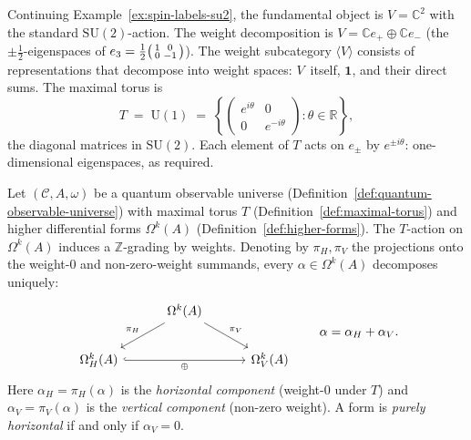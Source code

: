 \begin{example}
\label{ex:maximal-torus-su2}
Continuing Example~\ref{ex:spin-labels-su2}, the fundamental object is
$V = \mathbb{C}^2$ with the standard $\mathrm{SU}(2)$-action.  The
weight decomposition is $V = \mathbb{C} e_+ \oplus \mathbb{C} e_-$
(the $\pm\tfrac{1}{2}$-eigenspaces of
$e_3 = \frac{1}{2}\begin{psmallmatrix} 1 & 0 \\ 0 & -1 \end{psmallmatrix}$).
The weight subcategory $\langle V \rangle$ consists of representations
that decompose into weight spaces: $V$~itself, $\mathbf{1}$, and their
direct sums.  The maximal torus is
\[
  T \;=\; \mathrm{U}(1)
  \;=\; \left\{
    \begin{pmatrix} e^{i\theta} & 0 \\ 0 & e^{-i\theta} \end{pmatrix}
    : \theta \in \mathbb{R}
  \right\},
\]
the diagonal matrices in $\mathrm{SU}(2)$.  Each element of $T$ acts on
$e_{\pm}$ by $e^{\pm i\theta}$: one-dimensional eigenspaces, as required.
\end{example}

\begin{definition}
\label{def:weight-decomposition}
Let $(\mathcal{C}, A, \omega)$ be a quantum observable universe
(Definition~\ref{def:quantum-observable-universe}) with maximal torus
$T$ (Definition~\ref{def:maximal-torus}) and higher differential forms
$\Omega^k(A)$ (Definition~\ref{def:higher-forms}).  The $T$-action on
$\Omega^k(A)$ induces a $\mathbb{Z}$-grading by weights.  Denoting by
$\pi_H, \pi_V$ the projections onto the weight-$0$ and non-zero-weight
summands, every $\alpha \in \Omega^k(A)$ decomposes uniquely:
\begin{equation}\label{eq:weight-decomposition-cd}
\begin{tikzcd}[row sep=2em, column sep=3em]
  & \Omega^k(A) \ar[dl, "\pi_H"'] \ar[dr, "\pi_V"] & \\
  \Omega^k_H(A) \ar[rr, hook, "\oplus"']
  & & \Omega^k_V(A)
\end{tikzcd}
\qquad \alpha = \alpha_H + \alpha_V.
\end{equation}
Here $\alpha_H = \pi_H(\alpha)$ is the \emph{horizontal component}
(weight-$0$ under $T$) and $\alpha_V = \pi_V(\alpha)$ is the
\emph{vertical component} (non-zero weight).  A form is \emph{purely
horizontal} if and only if $\alpha_V = 0$.
\end{definition}

